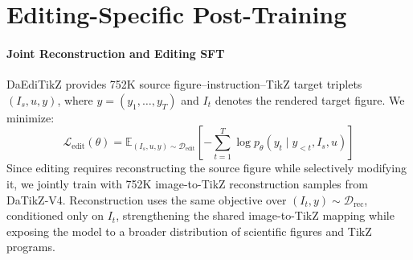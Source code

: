 \section{Editing-Specific Post-Training}
\label{sec:Editing-Specific Post-Training}

\paragraph{Joint Reconstruction and Editing SFT}
DaEdiTikZ provides 752K source figure--instruction--TikZ target triplets $(I_s,u,y)$, where $y=(y_1,\ldots,y_T)$ and $I_t$ denotes the rendered target figure. We minimize:
\begin{equation}
\mathcal{L}_{\mathrm{edit}}(\theta)=
\mathbb{E}_{(I_s,u,y)\sim\mathcal{D}_{\mathrm{edit}}}
\left[-\sum_{t=1}^{T}\log p_\theta(y_t\mid y_{<t},I_s,u)\right]
\label{eq:sft_edit}
\end{equation}
Since editing requires reconstructing the source figure while selectively modifying it, we jointly train with 752K image-to-TikZ reconstruction samples from DaTikZ-V4. Reconstruction uses the same objective over $(I_t,y)\sim\mathcal{D}_{\mathrm{rec}}$, conditioned only on $I_t$, strengthening the shared image-to-TikZ mapping while exposing the model to a broader distribution of scientific figures and TikZ programs.


